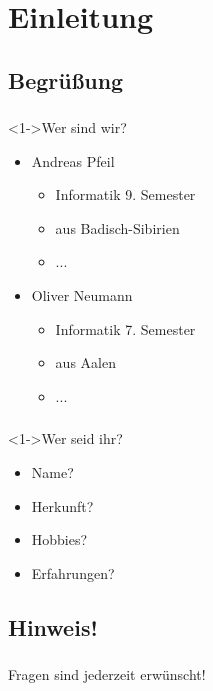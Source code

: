 \section{Einleitung}
\subsection{Begrüßung}
\begin{frame}
	\frametitle{\currentsection}
	\framesubtitle{\currentsubsection}
  \begin{block}<1->{Wer sind wir?}
  \begin{itemize}
  	\item Andreas Pfeil
  	\begin{itemize}
  		\item Informatik 9. Semester
  		\item aus Badisch-Sibirien
  		\item ...
  	\end{itemize}
  	\item Oliver Neumann
	\begin{itemize}
		\item Informatik 7. Semester
		\item aus Aalen
		\item ...
	\end{itemize}
  \end{itemize}
  \end{block}
\end{frame}
\begin{frame}
	\frametitle{\currentsection}
	\framesubtitle{\currentsubsection}
	\begin{block}<1->{Wer seid ihr?}
		\begin{itemize}
			\item Name?
			\item Herkunft?
			\item Hobbies?
			\item Erfahrungen?
		\end{itemize}
	\end{block}
\end{frame}


\subsection{Hinweis!}
\begin{frame}[c]
	\frametitle{\currentsection}
	\framesubtitle{\currentsubsection}
	\centering \Huge Fragen sind jederzeit erwünscht!
\end{frame}
